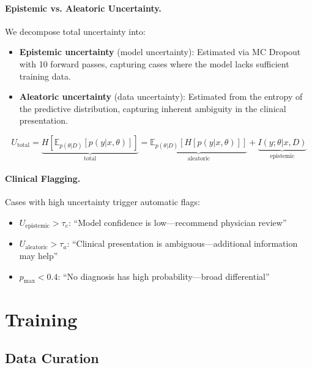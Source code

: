 \documentclass[11pt,a4paper]{article}
\begin{document}
\paragraph{Epistemic vs. Aleatoric Uncertainty.} We decompose total uncertainty into:
\begin{itemize}
    \item \textbf{Epistemic uncertainty} (model uncertainty): Estimated via MC Dropout \citep{gal2016dropout} with 10 forward passes, capturing cases where the model lacks sufficient training data.
    \item \textbf{Aleatoric uncertainty} (data uncertainty): Estimated from the entropy of the predictive distribution, capturing inherent ambiguity in the clinical presentation.
\end{itemize}
\begin{equation}
    U_{\text{total}} = \underbrace{H[\mathbb{E}_{p(\theta|D)}[p(y|x,\theta)]]}_{\text{total}} = \underbrace{\mathbb{E}_{p(\theta|D)}[H[p(y|x,\theta)]]}_{\text{aleatoric}} + \underbrace{I(y;\theta|x,D)}_{\text{epistemic}}
\end{equation}

\paragraph{Clinical Flagging.} Cases with high uncertainty trigger automatic flags:
\begin{itemize}
    \item $U_{\text{epistemic}} > \tau_e$: ``Model confidence is low---recommend physician review''
    \item $U_{\text{aleatoric}} > \tau_a$: ``Clinical presentation is ambiguous---additional information may help''
    \item $p_{\max} < 0.4$: ``No diagnosis has high probability---broad differential''
\end{itemize}

\section{Training}
\label{sec:training}

\subsection{Data Curation}
\end{document}
